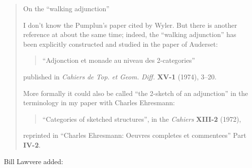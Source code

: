 \documentclass{article}
\begin{document}
\begin{quote}
On the ``walking adjunction''

I don't know the Pumplun's paper cited by Wyler. But there is another
reference at about the same time; indeed, the ``walking adjunction'' has
been explicitly constructed and studied in the paper of Auderset:

\begin{quote}
``Adjonction et monade au niveau des 2-categories''
\end{quote}

published in \emph{Cahiers de Top. et Geom. Diff.} \textbf{XV-1} (1974),
3--20.

More formally it could also be called ``the 2-sketch of an adjunction''
in the terminology in my paper with Charles Ehresmann:

\begin{quote}
``Categories of sketched structures'', in the \emph{Cahiers}
\textbf{XIII-2} (1972),
\end{quote}

reprinted in ``Charles Ehresmann: Oeuvres completes et commentees'' Part
\textbf{IV-2}.
\end{quote}

Bill Lawvere added:
\end{document}
